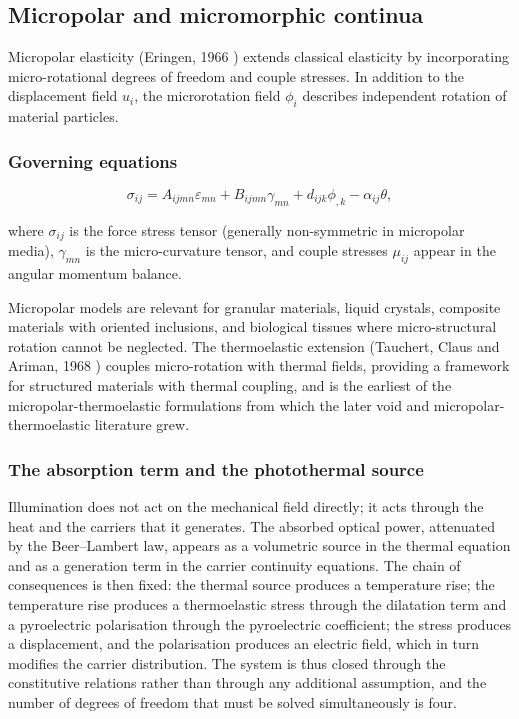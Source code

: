\subsection{Micropolar and micromorphic continua}
\label{sec:5.5}

Micropolar elasticity (Eringen, 1966 \cite{Eringen1966a}) extends classical elasticity by incorporating micro-rotational degrees of freedom and couple stresses. In addition to the displacement field $u_i$, the microrotation field $\phi_i$ describes independent rotation of material particles.

\subsubsection{Governing equations}

\begin{equation}
\sigma_{ij} = A_{ijmn}\varepsilon_{mn} + B_{ijmn}\gamma_{mn} + d_{ijk}\phi_{,k} - \alpha_{ij}\theta,
\label{eq:5.17}
\end{equation}

where $\sigma_{ij}$ is the force stress tensor (generally non-symmetric in micropolar media), $\gamma_{mn}$ is the micro-curvature tensor, and couple stresses $\mu_{ij}$ appear in the angular momentum balance.

Micropolar models are relevant for granular materials, liquid crystals, composite materials with oriented inclusions, and biological tissues where micro-structural rotation cannot be neglected. The thermoelastic extension (Tauchert, Claus and Ariman, 1968 \cite{Eringen1968b}) couples micro-rotation with thermal fields, providing a framework for structured materials with thermal coupling, and is the earliest of the micropolar-thermoelastic formulations from which the later void and micropolar-thermoelastic literature grew.

\subsubsection{The absorption term and the photothermal source}

Illumination does not act on the mechanical field directly; it acts through the heat and the carriers that it generates. The absorbed optical power, attenuated by the Beer--Lambert law, appears as a volumetric source in the thermal equation and as a generation term in the carrier continuity equations. The chain of consequences is then fixed: the thermal source produces a temperature rise; the temperature rise produces a thermoelastic stress through the dilatation term and a pyroelectric polarisation through the pyroelectric coefficient; the stress produces a displacement, and the polarisation produces an electric field, which in turn modifies the carrier distribution. The system is thus closed through the constitutive relations rather than through any additional assumption, and the number of degrees of freedom that must be solved simultaneously is four.

